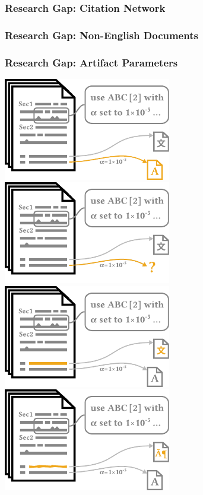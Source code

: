 \documentclass[en,16:9,smallfoot]{sdqbeamer}
\begin{document}
   \begin{frame}
       \frametitle<1-2>{Research Gap: Citation Network}
       \frametitle<3-6>{Research Gap: Non-English Documents}
       \frametitle<7-8>{Research Gap: Artifact Parameters}
       \begin{overprint}
            \centering\includegraphics[width=0.55\textwidth]{imgs/schema_add_09_vargapcit_0}
            \centering\includegraphics[width=0.55\textwidth]{imgs/schema_add_09_vargapcit_1}
            \centering\includegraphics[width=0.55\textwidth]{imgs/schema_add_09_vargapling_0}
            \centering\includegraphics[width=0.55\textwidth]{imgs/schema_add_09_vargapling_1}

\end{overprint}
\end{frame}
\end{document}
